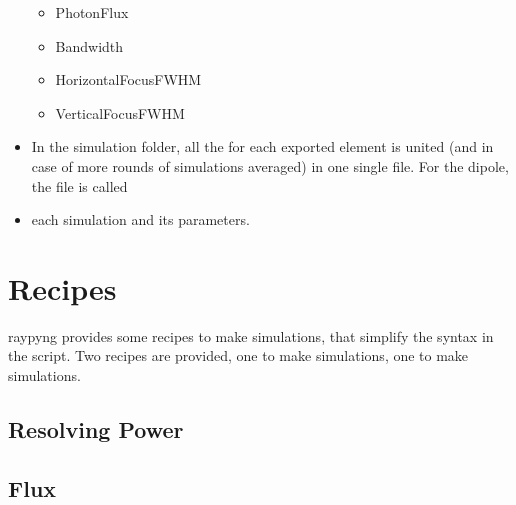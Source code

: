 \documentclass[letterpaper,10pt,english]{sphinxmanual}
\begin{document}
\begin{itemize}
\begin{itemize}
\item {} 
\sphinxAtStartPar
PhotonFlux

\item {} 
\sphinxAtStartPar
Bandwidth

\item {} 
\sphinxAtStartPar
HorizontalFocusFWHM

\item {} 
\sphinxAtStartPar
VerticalFocusFWHM

\end{itemize}

\item {} 
\sphinxAtStartPar
In the simulation folder, all the for each exported element
is united (and in case of more rounds of simulations averaged)
in one single file. For the dipole, the file is called 

\item {} 
\sphinxAtStartPar
{} each simulation and its parameters.

\end{itemize}


\section{Recipes}
\label{\detokenize{tutorial:recipes}}
\sphinxAtStartPar
raypyng provides some recipes to make simulations,
that simplify the syntax in the script.
Two recipes are provided, one to make  simulations,
one to make 
simulations.


\subsection{Resolving Power}
\label{\detokenize{tutorial:id1}}

\subsection{Flux}
\label{\detokenize{tutorial:id2}}
\end{document}
